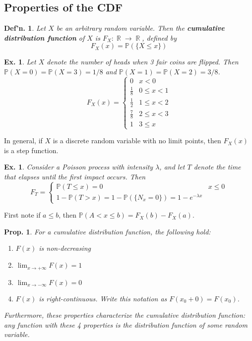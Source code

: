 \documentclass[12pt, a4paper]{book}
\DeclareMathOperator{\R}{\mathbb{R}}
\renewcommand{\Pr}{\mathbb{P}}
\newtheorem{definition}[theorem]{Def'n.}
\newtheorem{proposition}[theorem]{Prop.}
\newtheorem{example}[theorem]{Ex.}
\theoremstyle{nonumberplain}
\begin{document}
\subsection{Properties of the CDF}
\begin{definition}
    Let $X$ be an arbitrary random variable.
    Then the \textbf{cumulative distribution function} of $X$ is $F_X:\R\to\R$, defined by
    \[F_X(x)=\Pr(\{X\leq x\})\]
\end{definition}
\begin{example}
    Let $X$ denote the number of heads when 3 fair coins are flipped.
    Then $\Pr(X=0)=\Pr(X=3)=1/8$ and $\Pr(X=1)=\Pr(X=2)=3/8$.
    \[F_X(x)=
        \begin{cases}
            0 & x<0\\
            \frac{1}{8} & 0\leq x<1\\
            \frac{1}{2} & 1\leq x<2\\
            \frac{7}{8} & 2\leq x<3\\
            1 & 3\leq x
        \end{cases}
    \]
\end{example}
In general, if $X$ is a discrete random variable with no limit points, then $F_X(x)$ is a step function.
\begin{example}
    Consider a Poisson process with intensity $\lambda$, and let $T$ denote the time that elapses until the first impact occurs.
    Then
    \[F_T=
        \begin{cases}
            \Pr(T\leq x)=0 &x\leq 0\\
            1-\Pr(T>x)=1-\Pr(\{N_x=0\})=1-e^{-\lambda x}
        \end{cases}
    \]
\end{example}
First note if $a\leq b$, then $\Pr(A<x\leq b)=F_X(b)-F_X(a)$.
\begin{proposition}
    For a cumulative distribution function, the following hold:
    \begin{enumerate}
        \item $F(x)$ is non-decreasing
        \item $\lim_{x\to+\infty}F(x)=1$
        \item $\lim_{x\to-\infty}F(x)=0$
        \item $F(x)$ is right-continuous.
            Write this notation as $F(x_0+0)=F(x_0)$.
    \end{enumerate}
    Furthermore, these properties characterize the cumulative distribution function: any function with these 4 properties is the distribution function of some random variable.
\end{proposition}
\end{document}
